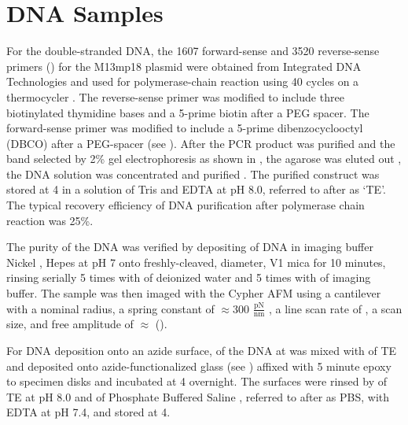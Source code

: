 \section{DNA Samples}

For the  double-stranded DNA, the 1607 forward-sense and 3520 reverse-sense primers () for the M13mp18 plasmid  were obtained from Integrated DNA Technologies  and used for polymerase-chain reaction  using 40 cycles on a thermocycler . The reverse-sense primer was modified to include three biotinylated thymidine bases and a 5-prime biotin after a PEG spacer. The forward-sense primer was modified to include a 5-prime dibenzocyclooctyl (DBCO) after a PEG-spacer (see ). After the PCR product was purified  and the  band selected by 2\% gel electrophoresis  as shown in , the agarose was eluted out , the DNA solution was concentrated  and purified . The purified construct was stored at 4\degreeC{} in a solution of  Tris  and  EDTA  at pH 8.0, referred to after as `TE'. The typical recovery efficiency of DNA purification after polymerase chain reaction was 25\%. 

The purity of the DNA was verified by depositing  of DNA in imaging buffer \textemdash{}  Nickel ,  Hepes  at pH 7 \textemdash{} onto freshly-cleaved,  diameter, V1 mica  for 10 minutes, rinsing serially 5 times with  of deionized water and 5 times with  of imaging buffer. The sample was then imaged with the Cypher AFM using a cantilever with a nominal  radius, a spring constant of $\approx$300 $\frac{\text{pN}}{\text{nm}}$ , a line scan rate of , a  scan size, and free amplitude of $\approx$ (). 

For DNA deposition onto an azide surface,  of the DNA at  was mixed with  of TE and deposited onto azide-functionalized glass (see ) affixed with 5 minute epoxy  to specimen disks  and incubated at 4\degreeC{} overnight. The surfaces were rinsed by  of TE at pH 8.0 and  of Phosphate Buffered Saline , referred to after as PBS, with  EDTA at pH 7.4, and stored at 4\degreeC{}. 

